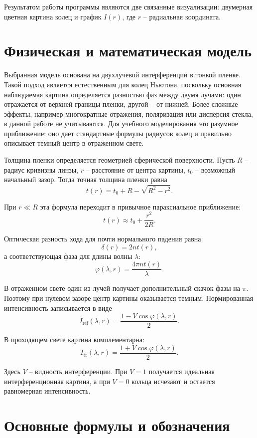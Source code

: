\documentclass[12pt,a4paper]{article}
\begin{document}
Результатом работы программы являются две связанные визуализации: двумерная цветная картина колец и
график \(I(r)\), где \(r\) -- радиальная координата.

\section{Физическая и математическая модель}

Выбранная модель основана на двухлучевой интерференции в тонкой пленке. Такой подход является
естественным для колец Ньютона, поскольку основная наблюдаемая картина определяется разностью фаз
между двумя лучами: один отражается от верхней границы пленки, другой -- от нижней. Более сложные
эффекты, например многократные отражения, поляризация или дисперсия стекла, в данной работе не
учитываются. Для учебного моделирования это разумное приближение: оно дает стандартные формулы
радиусов колец и правильно описывает темный центр в отраженном свете.

Толщина пленки определяется геометрией сферической поверхности. Пусть \(R\) -- радиус кривизны линзы,
\(r\) -- расстояние от центра картины, \(t_0\) -- возможный начальный зазор. Тогда точная толщина
пленки равна
\[
t(r)=t_0+R-\sqrt{R^2-r^2}.
\]

При \(r\ll R\) эта формула переходит в привычное параксиальное приближение:
\[
t(r)\approx t_0+\frac{r^2}{2R}.
\]

Оптическая разность хода для почти нормального падения равна
\[
\delta(r)=2nt(r),
\]
а соответствующая фаза для длины волны \(\lambda\):
\[
\varphi(\lambda,r)=\frac{4\pi nt(r)}{\lambda}.
\]

В отраженном свете один из лучей получает дополнительный скачок фазы на \(\pi\). Поэтому при
нулевом зазоре центр картины оказывается темным. Нормированная интенсивность записывается в виде
\[
I_{\mathrm{ref}}(\lambda,r)=\frac{1-V\cos\varphi(\lambda,r)}{2}.
\]

В проходящем свете картина комплементарна:
\[
I_{\mathrm{tr}}(\lambda,r)=\frac{1+V\cos\varphi(\lambda,r)}{2}.
\]

Здесь \(V\) -- видность интерференции. При \(V=1\) получается идеальная интерференционная картина, а
при \(V=0\) кольца исчезают и остается равномерная интенсивность.

\section{Основные формулы и обозначения}
\end{document}
